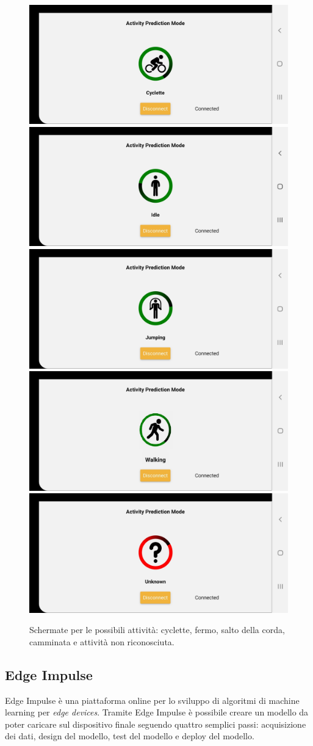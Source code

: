 \begin{figure}[tbh]
	\centering
	\includegraphics[width=0.4\linewidth]{./ImageFiles/cyclette}
	\includegraphics[width=0.4\linewidth]{./ImageFiles/idle}
	\includegraphics[width=0.4\linewidth]{./ImageFiles/jumping}
	\includegraphics[width=0.4\linewidth]{./ImageFiles/walking}
	\includegraphics[width=0.4\linewidth]{./ImageFiles/unknown}
	\caption{Schermate per le possibili attività: cyclette, fermo, salto della corda, camminata e attività non riconosciuta.}
	\label{fig:attivitafisica}
\end{figure}

\subsection{Edge Impulse}
Edge Impulse è una piattaforma online per lo sviluppo di algoritmi di machine learning per \textit{edge devices}. Tramite Edge Impulse è possibile creare un modello da poter caricare sul dispositivo finale seguendo quattro semplici passi: acquisizione dei dati, design del modello, test del modello e deploy del modello. 

